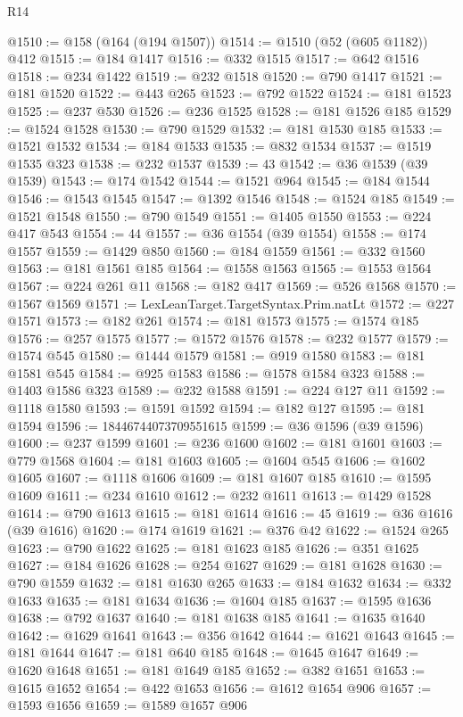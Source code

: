 \begin{lexlean}{R14}
\begin{coremodule}
@1510 := @158 (@164 (@194 @1507))
@1514 := @1510 (@52 (@605 @1182)) @412
@1515 := @184 @1417
@1516 := @332 @1515
@1517 := @642 @1516
@1518 := @234 @1422
@1519 := @232 @1518
@1520 := @790 @1417
@1521 := @181 @1520
@1522 := @443 @265
@1523 := @792 @1522
@1524 := @181 @1523
@1525 := @237 @530
@1526 := @236 @1525
@1528 := @181 @1526 @185
@1529 := @1524 @1528
@1530 := @790 @1529
@1532 := @181 @1530 @185
@1533 := @1521 @1532
@1534 := @184 @1533
@1535 := @832 @1534
@1537 := @1519 @1535 @323
@1538 := @232 @1537
@1539 := 43
@1542 := @36 @1539 (@39 @1539)
@1543 := @174 @1542
@1544 := @1521 @964
@1545 := @184 @1544
@1546 := @1543 @1545
@1547 := @1392 @1546
@1548 := @1524 @185
@1549 := @1521 @1548
@1550 := @790 @1549
@1551 := @1405 @1550
@1553 := @224 @417 @543
@1554 := 44
@1557 := @36 @1554 (@39 @1554)
@1558 := @174 @1557
@1559 := @1429 @850
@1560 := @184 @1559
@1561 := @332 @1560
@1563 := @181 @1561 @185
@1564 := @1558 @1563
@1565 := @1553 @1564
@1567 := @224 @261 @11
@1568 := @182 @417
@1569 := @526 @1568
@1570 := @1567 @1569
@1571 := LexLeanTarget.TargetSyntax.Prim.natLt
@1572 := @227 @1571
@1573 := @182 @261
@1574 := @181 @1573
@1575 := @1574 @185
@1576 := @257 @1575
@1577 := @1572 @1576
@1578 := @232 @1577
@1579 := @1574 @545
@1580 := @1444 @1579
@1581 := @919 @1580
@1583 := @181 @1581 @545
@1584 := @925 @1583
@1586 := @1578 @1584 @323
@1588 := @1403 @1586 @323
@1589 := @232 @1588
@1591 := @224 @127 @11
@1592 := @1118 @1580
@1593 := @1591 @1592
@1594 := @182 @127
@1595 := @181 @1594
@1596 := 18446744073709551615
@1599 := @36 @1596 (@39 @1596)
@1600 := @237 @1599
@1601 := @236 @1600
@1602 := @181 @1601
@1603 := @779 @1568
@1604 := @181 @1603
@1605 := @1604 @545
@1606 := @1602 @1605
@1607 := @1118 @1606
@1609 := @181 @1607 @185
@1610 := @1595 @1609
@1611 := @234 @1610
@1612 := @232 @1611
@1613 := @1429 @1528
@1614 := @790 @1613
@1615 := @181 @1614
@1616 := 45
@1619 := @36 @1616 (@39 @1616)
@1620 := @174 @1619
@1621 := @376 @42
@1622 := @1524 @265
@1623 := @790 @1622
@1625 := @181 @1623 @185
@1626 := @351 @1625
@1627 := @184 @1626
@1628 := @254 @1627
@1629 := @181 @1628
@1630 := @790 @1559
@1632 := @181 @1630 @265
@1633 := @184 @1632
@1634 := @332 @1633
@1635 := @181 @1634
@1636 := @1604 @185
@1637 := @1595 @1636
@1638 := @792 @1637
@1640 := @181 @1638 @185
@1641 := @1635 @1640
@1642 := @1629 @1641
@1643 := @356 @1642
@1644 := @1621 @1643
@1645 := @181 @1644
@1647 := @181 @640 @185
@1648 := @1645 @1647
@1649 := @1620 @1648
@1651 := @181 @1649 @185
@1652 := @382 @1651
@1653 := @1615 @1652
@1654 := @422 @1653
@1656 := @1612 @1654 @906
@1657 := @1593 @1656
@1659 := @1589 @1657 @906

\end{coremodule}
\end{lexlean}
